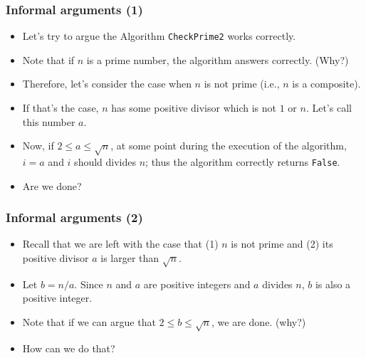\begin{frame}\frametitle{Informal arguments (1)}
  \begin{itemize}
  \item Let's try to argue the Algorithm {\tt CheckPrime2} works
    correctly.  \pause

  \item
    Note that if $n$ is a prime number, the algorithm answers
    correctly. (Why?)  \pause

  \item Therefore, let's consider the case when $n$ is not prime
    (i.e., $n$ is a composite).  \pause

  \item If that's the case, $n$ has some positive divisor which is not
    $1$ or $n$.  Let's call this number $a$.  \pause

  \item Now, if $2\leq a\leq\sqrt{n}$, at some point during the
    execution of the algorithm, $i=a$ and $i$ should divides $n$; thus
    the algorithm correctly returns {\tt False}.  \pause

  \item
    Are we done?
  \end{itemize}
  
\end{frame}

\begin{frame}\frametitle{Informal arguments (2)}
  \begin{itemize}
  \item Recall that we are left with the case that (1) $n$ is not
    prime and (2) its positive divisor $a$ is larger than
    $\sqrt{n}$. \pause

  \item
    Let $b=n/a$.  Since $n$ and $a$ are positive integers and $a$
    divides $n$, $b$ is also a positive integer.
    \pause

  \item
    Note that if we can argue that $2\leq b\leq\sqrt{n}$, we are done.
    (why?)
    \pause

  \item
    How can we do that?
  \end{itemize}
  
\end{frame}

